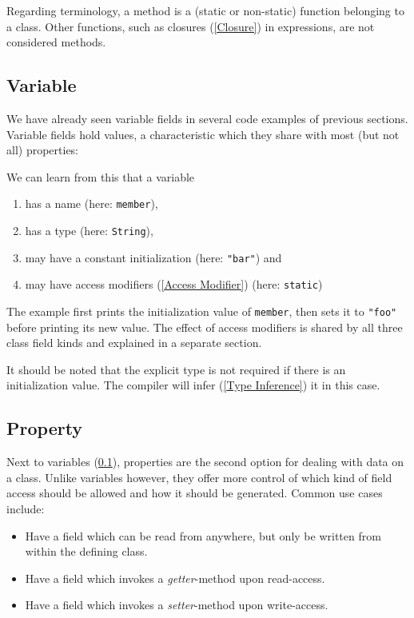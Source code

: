 \documentclass{article}
\newcommand{\type}[1]{\texttt{#1}}
\newcommand{\expr}[1]{\texttt{#1}}
\newcommand{\tref}[2]{#1 (\ref{#2})}
\newcommand{\haxe}[2][]{%
}
\begin{document}
Regarding terminology, a method is a (static or non-static) function belonging to a class. Other functions, such as \tref{closures}{Closure} in expressions, are not considered methods.

\subsection{Variable}
\label{Variable}

We have already seen variable fields in several code examples of previous sections. Variable fields hold values, a characteristic which they share with most (but not all) properties:

\haxe{assets/VariableField.hx}
We can learn from this that a variable

\begin{enumerate}
	\item has a name (here: \expr{member}),
	\item has a type (here: \type{String}),
	\item may have a constant initialization (here: \expr{"bar"}) and
	\item may have \tref{access modifiers}{Access Modifier} (here: \expr{static})
\end{enumerate}
The example first prints the initialization value of \expr{member}, then sets it to \expr{"foo"} before printing its new value. The effect of access modifiers is shared by all three class field kinds and explained in a separate section.

It should be noted that the explicit type is not required if there is an initialization value. The compiler will \tref{infer}{Type Inference} it in this case.




\subsection{Property}
\label{Property}

Next to \tref{variables}{Variable}, properties are the second option for dealing with data on a class. Unlike variables however, they offer more control of which kind of field access should be allowed and how it should be generated. Common use cases include:

\begin{itemize}
	\item Have a field which can be read from anywhere, but only be written from within the defining class.
	\item Have a field which invokes a \emph{getter}-method upon read-access.
	\item Have a field which invokes a \emph{setter}-method upon write-access.
\end{itemize}
\end{document}
